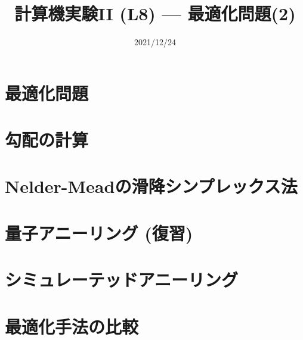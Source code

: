 \documentclass[10pt,dvipdfmx]{beamer}
\title{計算機実験II (L8) --- 最適化問題(2)}
\date{2021/12/24}
\begin{document}
\begin{frame}
  \titlepage
  \tableofcontents
\end{frame}

\section{最適化問題}




\section{勾配の計算}


% 



\section{Nelder-Meadの滑降シンプレックス法}




\section{量子アニーリング (復習)}




\section{シミュレーテッドアニーリング}





\section{最適化手法の比較}








\section{}
\end{document}

